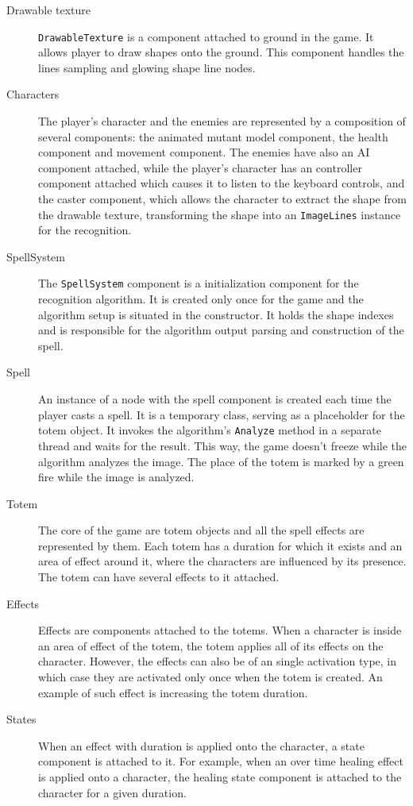 \begin{description}
\item [Drawable texture] \texttt{DrawableTexture} is a component attached to ground in the game. It allows player to draw shapes onto the ground. This component handles the lines sampling and glowing shape line nodes.

\item [Characters] The player's character and the enemies are represented by a composition of several components: the animated mutant model component, the health component and movement component. The enemies have also an AI component attached, while the player's character has an controller component attached which causes it to listen to the keyboard controls, and the caster component, which allows the character to extract the shape from the drawable texture, transforming the shape into an \texttt{ImageLines} instance for the recognition.

\item [SpellSystem] The \texttt{SpellSystem} component is a initialization component for the recognition algorithm. It is created only once for the game and the algorithm setup is situated in the constructor. It holds the shape indexes and is responsible for the algorithm output parsing and construction of the spell.

\item [Spell] An instance of a node with the spell component is created each time the player casts a spell. It is a temporary class, serving as a placeholder for the totem object. It invokes the algorithm's \texttt{Analyze} method in a separate thread and waits for the result. This way, the game doesn't freeze while the algorithm analyzes the image. The place of the totem is marked by a green fire while the image is analyzed. 

\item [Totem] The core of the game are totem objects and all the spell effects are represented by them. Each totem has a duration for which it exists and an area of effect around it, where the characters are influenced by its presence. The totem can have several effects to it attached.

\item [Effects]  Effects are components attached to the totems. When a character is inside an area of effect of the totem, the totem applies all of its effects on the character. However, the effects can also be of an single activation type, in which case they are activated only once when the totem is created. An example of such effect is increasing the totem duration.

\item [States] When an effect with duration is applied onto the character, a state component is attached to it. For example, when an over time healing effect is applied onto a character, the healing state component is attached to the character for a given duration.

\end{description}


